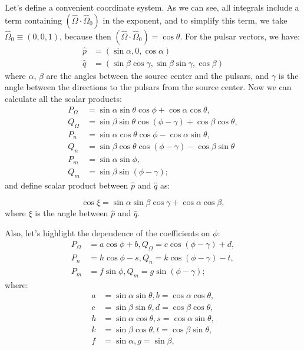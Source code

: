 Let's define a convenient coordinate system. As we can see, all integrals include a term containing $(\hat{\Omega} \cdot \hat{\Omega}_0)$ in the exponent, and to simplify this term, we take $\hat{\Omega}_0 \equiv (0, 0, 1)$, because then $(\hat{\Omega} \cdot \hat{\Omega}_0) = \cos \theta$. For the pulsar vectors, we have:
\begin{subequations}
\begin{align}
    \hat{p} &= (\sin \alpha, 0, \cos \alpha) \\
    \hat{q} &= (\sin \beta \cos \gamma, \sin \beta \sin \gamma, \cos \beta)
\end{align}
\end{subequations}
where $\alpha$, $\beta$ are the angles between the source center and the pulsars, and $\gamma$ is the angle between the directions to the pulsars from the source center. Now we can calculate all the scalar products:
\begin{align*}
    P_{\Omega} &= \sin \alpha \sin \theta \cos \phi + \cos \alpha \cos \theta, \\
    Q_{\Omega} &= \sin \beta \sin \theta \cos (\phi - \gamma) + \cos \beta \cos \theta, \\
    P_{n} &= \sin \alpha \cos \theta \cos \phi - \cos \alpha \sin \theta, \\
    Q_{n} &= \sin \beta \cos \theta \cos (\phi - \gamma) - \cos \beta \sin \theta \\
    P_{m} &= \sin \alpha \sin \phi, \\
    Q_{m} &= \sin \beta \sin (\phi - \gamma);
\end{align*}
and define scalar product between $\hat{p}$ and $\hat{q}$ as:

\begin{equation}
    \cos \xi = \sin \alpha \sin \beta \cos \gamma + \cos \alpha \cos \beta,
\end{equation}
where $\xi$ is the angle between $\hat{p}$ and $\hat{q}$.

Also, let's highlight the dependence of the coefficients on $\phi$:
\begin{subequations}
\begin{align}
    P_{\Omega} &= a \cos \phi + b, Q_{\Omega} = c \cos (\phi - \gamma) + d, \\
    P_{n} &= h \cos \phi - s, Q_{n} = k \cos (\phi - \gamma) - t, \\
    P_{m} &= f \sin \phi, Q_{m} = g \sin (\phi - \gamma);
\end{align}
\end{subequations}
where:
\begin{subequations}
\begin{align}
    a &= \sin \alpha \sin \theta, b = \cos \alpha \cos \theta, \\
    c &= \sin \beta \sin \theta, d = \cos \beta \cos \theta, \\
    h &= \sin \alpha \cos \theta, s = \cos \alpha \sin \theta, \\
    k &= \sin \beta \cos \theta, t = \cos \beta \sin \theta, \\
    f &= \sin \alpha , g = \sin \beta,
\end{align}

\end{subequations}